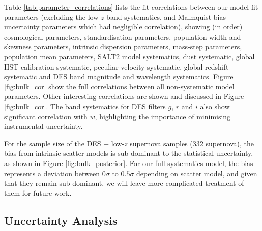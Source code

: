 \documentclass[a4paper,fleqn,usenatbib,manuscript]{emulateapj}
\begin{document}
Table \ref{tab:parameter_correlations} lists the fit correlations between our model fit parameters (excluding the low-$z$ band systematics, and Malmquist bias uncertainty parameters which had negligible correlation), showing (in order) cosmological parameters, standardisation parameters, population width and skewness parameters, intrinsic dispersion parameters, mass-step parameters, population mean parameters, SALT2 model systematics, dust systematic, global HST calibration systematic, peculiar velocity systematic, global redshift systematic and DES band magnitude and wavelength systematics. Figure \ref{fig:bulk_cor} show the full correlations between all non-systematic model parameters. Other interesting correlations are shown and discussed in Figure \ref{fig:bulk_cor}. The band systematics for DES filters $g$, $r$ and $i$ also show significant correlation with $w$, highlighting the importance of minimising instrumental uncertainty.


For the sample size of the DES $+$ low-$z$ supernova samples (332 supernova), the bias from intrinsic scatter models is sub-dominant to the statistical uncertainty, as shown in Figure \ref{fig:bulk_posterior}. For our full systematics model, the bias represents a deviation between $0\sigma$ to $0.5\sigma$ depending on scatter model, and given that they remain sub-dominant, we will leave more complicated treatment of them for future work.




\subsection{Uncertainty Analysis}
\label{sec:ucnert}
\end{document}
